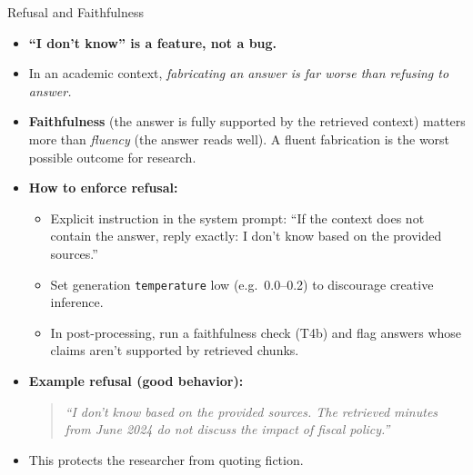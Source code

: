 \begin{frame}{Refusal and Faithfulness}
\begin{itemize}
\item \textbf{``I don't know'' is a feature, not a bug.}

\medskip
\item In an academic context, \emph{fabricating an answer is far worse than refusing to answer.}

\medskip
\item \textbf{Faithfulness} (the answer is fully supported by the retrieved context) matters more than \emph{fluency} (the answer reads well). A fluent fabrication is the worst possible outcome for research.

\medskip
\item \textbf{How to enforce refusal:}
\begin{itemize}
    \item Explicit instruction in the system prompt: ``If the context does not contain the answer, reply exactly: I don't know based on the provided sources.''
    \item Set generation \texttt{temperature} low (e.g.\ 0.0--0.2) to discourage creative inference.
    \item In post-processing, run a faithfulness check (T4b) and flag answers whose claims aren't supported by retrieved chunks.
\end{itemize}

\medskip
\item \textbf{Example refusal (good behavior):}
\begin{quote}
\small\itshape
``I don't know based on the provided sources. The retrieved minutes from June 2024 do not discuss the impact of fiscal policy.''
\end{quote}

\medskip
\item This protects the researcher from quoting fiction.
\end{itemize}
\end{frame}

